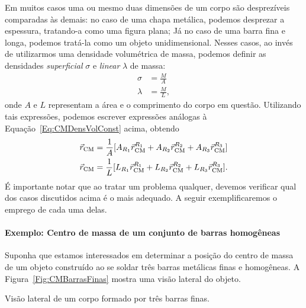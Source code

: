 Em muitos casos uma ou mesmo duas dimensões de um corpo são desprezíveis comparadas às demais: no caso de uma chapa metálica, podemos desprezar a espessura, tratando-a como uma figura plana; Já no caso de uma barra fina e longa, podemos tratá-la como um objeto unidimensional. Nesses casos, ao invés de utilizarmos uma densidade volumétrica de massa, podemos definir as densidades \emph{superficial} $\sigma$ e \emph{linear} $\lambda$ de massa:
\begin{align}
    \sigma &= \frac{M}{A} \\
    \lambda &= \frac{M}{L},
\end{align}
%
onde $A$ e $L$ representam a área e o comprimento do corpo em questão. Utilizando tais expressões, podemos escrever expressões análogas à Equação~\ref{Eq:CMDensVolConst} acima, obtendo
\begin{align}
    \vec{r}_{\rm{CM}} &= \frac{1}{A} [A_{R_1} \vec{r}_{\rm{CM}}^{R_1} + A_{R_2} \vec{r}_{\rm{CM}}^{R_2} + A_{R_3} \vec{r}_{\rm{CM}}^{R_3}] \label{Eq:CMDensSupConst}\\
    \vec{r}_{\rm{CM}} &= \frac{1}{L} [L_{R_1} \vec{r}_{\rm{CM}}^{R_1} + L_{R_2} \vec{r}_{\rm{CM}}^{R_2} + L_{R_3} \vec{r}_{\rm{CM}}^{R_3}].\label{Eq:CMDensLinConst}
\end{align}
%
É importante notar que ao tratar um problema qualquer, devemos verificar qual dos casos discutidos acima é o mais adequado. A seguir exemplificaremos o emprego de cada uma delas.

\paragraph{Exemplo: Centro de massa de um conjunto de barras homogêneas}

Suponha que estamos interessados em determinar a posição do centro de massa de um objeto construído ao se soldar três barras metálicas finas e homogêneas. A Figura~\ref{Fig:CMBarrasFinas} mostra uma visão lateral do objeto.

\begin{marginfigure}
\centering
{}
\caption{Visão lateral de um corpo formado por três barras finas. \label{Fig:CMBarrasFinas}}
\end{marginfigure}


